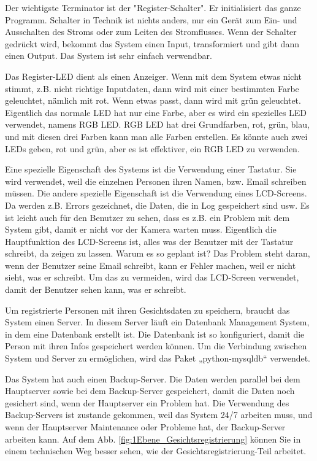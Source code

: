 Der wichtigste Terminator ist der "Register-Schalter". Er initialisiert das ganze Programm. Schalter in Technik ist nichts anders, nur ein Ger\"at zum Ein- und Ausschalten des Stroms oder zum Leiten des Stromflusses. Wenn der Schalter gedr\"uckt wird, bekommt das System einen Input, transformiert und gibt dann einen Output. Das System ist sehr einfach verwendbar.

Das Register-LED dient als einen Anzeiger. Wenn mit dem System etwas nicht stimmt, z.B. nicht richtige Inputdaten, dann wird mit einer bestimmten Farbe geleuchtet, n\"amlich mit rot. Wenn etwas passt, dann wird mit gr\"un geleuchtet. Eigentlich das normale LED hat nur eine Farbe, aber es wird ein spezielles LED verwendet, namens RGB LED. RGB LED hat drei Grundfarben, rot, gr\"un, blau, und mit diesen drei Farben kann man alle Farben erstellen. Es k\"onnte auch zwei LEDs geben, rot und gr\"un, aber es ist effektiver, ein RGB LED zu verwenden.

Eine spezielle Eigenschaft des Systems ist die Verwendung einer Tastatur. Sie wird verwendet, weil die einzelnen Personen ihren Namen, bzw. Email schreiben m\"ussen. 
Die andere spezielle Eigenschaft ist die Verwendung eines LCD-Screens. Da werden z.B. Errors gezeichnet, die Daten, die in Log gespeichert sind usw. Es ist leicht auch f\"ur den Benutzer zu sehen, dass es z.B. ein Problem mit dem System gibt, damit er nicht vor der Kamera warten muss. Eigentlich die Hauptfunktion des LCD-Screens ist, alles was der Benutzer mit der Tastatur schreibt, da zeigen zu lassen. Warum es so geplant ist? Das Problem steht daran, wenn der Benutzer seine Email schreibt, kann er Fehler machen, weil er nicht sieht, was er schreibt. Um das zu vermeiden, wird das LCD-Screen verwendet, damit der Benutzer sehen kann, was er schreibt.

Um registrierte Personen mit ihren Gesichtsdaten zu speichern, braucht das System einen Server. In diesem Server l\"auft ein Datenbank Management System, in dem eine Datenbank erstellt ist. Die Datenbank ist so konfiguriert, damit die Person mit ihren Infos gespeichert werden k\"onnen. Um die Verbindung zwischen System und Server zu erm\"oglichen, wird das Paket „python-mysqldb“ verwendet.

Das System hat auch einen Backup-Server. Die Daten werden parallel bei dem Hauptserver sowie bei dem Backup-Server gespeichert, damit die Daten noch gesichert sind, wenn der Hauptserver ein Problem hat. Die Verwendung des Backup-Servers ist zustande gekommen, weil das System 24/7 arbeiten muss, und wenn der Hauptserver Maintenance oder Probleme hat, der Backup-Server arbeiten kann. Auf dem Abb. \ref{fig:1Ebene_Gesichtsregistrierung} k\"onnen Sie in einem technischen Weg besser sehen, wie der Gesichtsregistrierung-Teil arbeitet.

